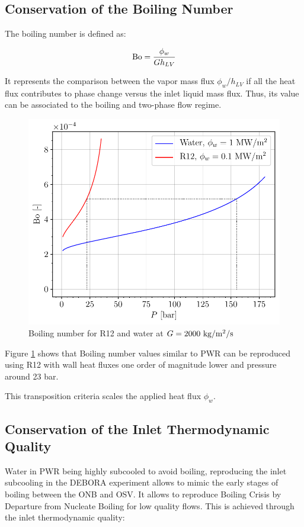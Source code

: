 \subsection{Conservation of the Boiling Number}

The boiling number is defined as:

\begin{equation}
\mathrm{Bo} = \frac{\phi_{w}}{G h_{LV}}
\end{equation}  

It represents the comparison between the vapor mass flux $\phi_{w}/h_{LV}$ if all the heat flux contributes to phase change versus the inlet liquid mass flux. Thus, its value can be associated to the boiling and two-phase flow regime.

\begin{figure}[!h]
\centering
\includegraphics[width=0.6\linewidth]{img/DEBORA/Bo_R12_PWR.pdf}
\caption{Boiling number for R12 and water at $G = 2000~\text{kg/m$^{2}$/s}$}
\label{fig:Bo_R12_PWR}
\end{figure}

Figure \ref{fig:Bo_R12_PWR} shows that Boiling number values similar to PWR can be reproduced using R12 with wall heat fluxes one order of magnitude lower and pressure around 23 bar.


\begin{note*}{}
This transposition criteria scales the applied heat flux $\phi_{w}$.
\end{note*}

\subsection{Conservation of the Inlet Thermodynamic Quality}

Water in PWR being highly subcooled to avoid boiling, reproducing the inlet subcooling in the DEBORA experiment allows to mimic the early stages of boiling between the ONB and OSV. It allows to reproduce Boiling Crisis by Departure from Nucleate Boiling for low quality flows. This is achieved through the inlet thermodynamic quality:


